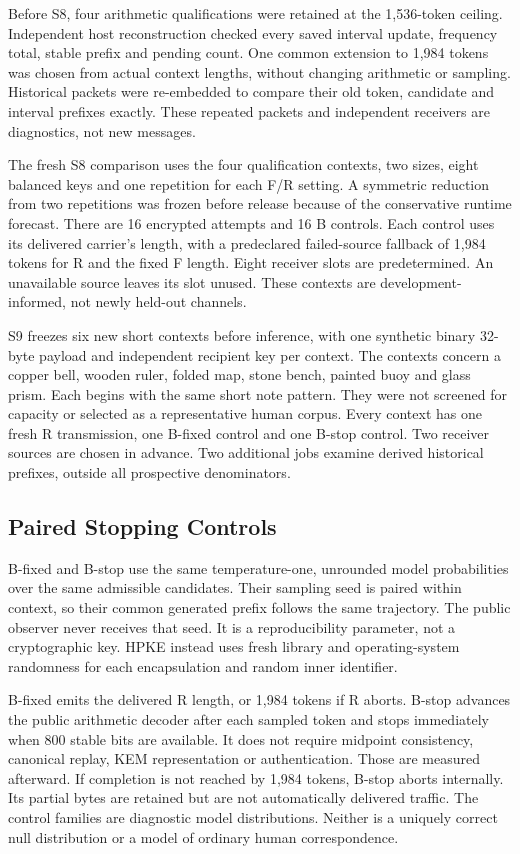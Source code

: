 \documentclass[a4paper,twoside]{article}
\begin{document}
Before S8, four arithmetic qualifications were retained at the 1,536-token ceiling. Independent host reconstruction checked every saved interval update, frequency total, stable prefix and pending count. One common extension to 1,984 tokens was chosen from actual context lengths, without changing arithmetic or sampling. Historical packets were re-embedded to compare their old token, candidate and interval prefixes exactly. These repeated packets and independent receivers are diagnostics, not new messages.

The fresh S8 comparison uses the four qualification contexts, two sizes, eight balanced keys and one repetition for each F/R setting. A symmetric reduction from two repetitions was frozen before release because of the conservative runtime forecast. There are 16 encrypted attempts and 16 B controls. Each control uses its delivered carrier's length, with a predeclared failed-source fallback of 1,984 tokens for R and the fixed F length. Eight receiver slots are predetermined. An unavailable source leaves its slot unused. These contexts are development-informed, not newly held-out channels.

S9 freezes six new short contexts before inference, with one synthetic binary 32-byte payload and independent recipient key per context. The contexts concern a copper bell, wooden ruler, folded map, stone bench, painted buoy and glass prism. Each begins with the same short note pattern. They were not screened for capacity or selected as a representative human corpus. Every context has one fresh R transmission, one B-fixed control and one B-stop control. Two receiver sources are chosen in advance. Two additional jobs examine derived historical prefixes, outside all prospective denominators.

\subsection{Paired Stopping Controls}
\noindent B-fixed and B-stop use the same temperature-one, unrounded model probabilities over the same admissible candidates. Their sampling seed is paired within context, so their common generated prefix follows the same trajectory. The public observer never receives that seed. It is a reproducibility parameter, not a cryptographic key. HPKE instead uses fresh library and operating-system randomness for each encapsulation and random inner identifier.

B-fixed emits the delivered R length, or 1,984 tokens if R aborts. B-stop advances the public arithmetic decoder after each sampled token and stops immediately when 800 stable bits are available. It does not require midpoint consistency, canonical replay, KEM representation or authentication. Those are measured afterward. If completion is not reached by 1,984 tokens, B-stop aborts internally. Its partial bytes are retained but are not automatically delivered traffic. The control families are diagnostic model distributions. Neither is a uniquely correct null distribution or a model of ordinary human correspondence.
\end{document}

